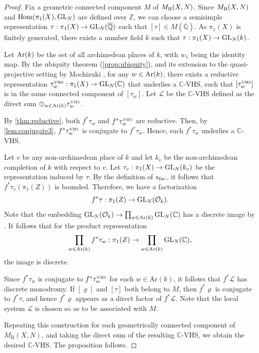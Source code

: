 \documentclass[english]{amsproc}
\theoremstyle{plain}
\theoremstyle{definition}
\theoremstyle{remark}
\theoremstyle{plain}
\numberwithin{equation}{thm} %
\def\vhs{\text{\tiny{VHS}}}
\newcommand{\cL}{\mathcal L}
\newcommand{\cO}{\mathcal O}
\newcommand{\bC}{\mathbb{C}}
\newcommand{\bQ}{\mathbb{Q}}
\newcommand{\bZ}{\mathbb{Z}}
\newcommand{\Hom}{{\rm Hom}}
\newcommand{\GL}{{\rm GL}}
\begin{document}
\begin{proof}
	Fix a  geometric connected component $M$ of  $M_{\rm B}(X,N)$. Since $M_{\rm B}(X,N)$ and $\Hom(\pi_1(X), \GL_N)$ are defined over $\bZ$, we can choose a semisimple representation $\tau:\pi_1(X)\to \GL_{N}(\overline{\bQ})$ such that  $[\tau]\in M(\overline{\bQ})$. As $\pi_1(X)$ is finitely generated, there exists a number field $k$ such that $\tau:\pi_1(X)\to \GL_N(k)$.
	
	Let ${\rm Ar}(k)$ be the set of all archimedean places of $k$, with $w_1$ being the identity map. By the ubiquity theorem (\cref{prop:ubiquity}),  and its extension to the quasi-projective setting by Mochizuki \cite{Moc06},  for any $w\in {\rm Ar}(k)$, there exists a reductive representation $\tau_{w}^{\text{\tiny{VHS}}}:\pi_1(X)\to {\rm GL}_N(\bC)$ that underlies a $\bC$-VHS, such that $[\tau_{w}^{\text{\tiny{VHS}}}]$ is in the same connected component of $[\tau_{w}]$. Let $\cL$ be the $\bC$-VHS defined as the direct sum $\oplus_{w\in {\rm Ar}(k)}\tau_w^\vhs$.
	
	By \cref{thm:reductive}, both \(f^{*}\tau_{w}\) and \(f^{*}\tau_{w}^{\vhs}\) are reductive. Then, by \cref{lem:conjugate3}, \(f^{*}\tau_{w}^{\vhs}\) is conjugate to \(f^{*}\tau_{w}\). Hence, each \(f^{*}\tau_{w}\) underlies a \(\mathbb{C}\)-VHS. %
	
	Let $v$ be any non-archimedean place of $k$ and let $k_v$ be the non-archimedean completion of $k$ with respect to $v$. Let $\tau_{v}:\pi_1(X)\to {\rm GL}_N(k_v)$ be the representation induced by $\tau$. By the definition of $s_{\rm fac}$, it follows that $f^*\tau_{v}(\pi_1(Z))$ is bounded. Therefore, we have a factorization
	$$
	f^*\tau:\pi_1(Z)\to {\rm GL}_N(\cO_k).
	$$
	Note that the embedding ${\rm GL}_N(\cO_k)\to \prod_{w\in {\rm Ar}(k)}{\rm GL}_N(\bC)$ has a discrete image by \cite[Proposition 6.1.3]{Zim}. It follows that for the product representation
	$$
	\prod_{w\in {\rm Ar}(k)}f^*\tau_{w}:\pi_1(Z)\to \prod_{w\in {\rm Ar}(k)}{\rm GL}_N(\bC),
	$$
	the image is discrete.
	
	Since \(f^{*}\tau_{w}\) is conjugate to \(f^{*}\tau_{w}^{\text{\tiny VHS}}\) for each 
	\(w\in \mathrm{Ar}(k)\), it follows that \(f^{*}\mathcal{L}\) has discrete monodromy. 
	If \([\varrho]\) and \([\tau]\) both belong to \(M\), then \(f^{*}\varrho\) is conjugate to 
	\(f^{*}\tau\), and hence \(f^{*}\varrho\) appears as a direct factor of \(f^{*}\mathcal{L}\).
	Note that the local system \(\mathcal{L}\) is chosen so as to be associated with \(M\).
	
	Repeating this construction for each geometrically connected component of 
	\(M_{\mathrm{B}}(X,N)\), and taking the direct sum of the resulting 
	\(\mathbb{C}\)-VHS, we obtain the desired \(\mathbb{C}\)-VHS.  
	The proposition follows.
\end{proof}
\end{document}
